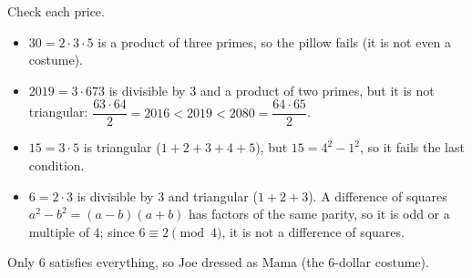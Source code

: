 Check each price.
\begin{itemize}
\item $30=2\cdot3\cdot5$ is a product of three primes, so the pillow fails (it is not even a costume).
\item $2019=3\cdot673$ is divisible by $3$ and a product of two primes, but it is not triangular: $\dfrac{63\cdot64}{2}=2016<2019<2080=\dfrac{64\cdot65}{2}$.
\item $15=3\cdot5$ is triangular ($1+2+3+4+5$), but $15=4^2-1^2$, so it fails the last condition.
\item $6=2\cdot3$ is divisible by $3$ and triangular ($1+2+3$). A difference of squares $a^2-b^2=(a-b)(a+b)$ has factors of the same parity, so it is odd or a multiple of $4$; since $6\equiv2\pmod 4$, it is not a difference of squares.
\end{itemize}
Only $6$ satisfies everything, so Joe dressed as $\boxed{\text{Mama}}$ (the $6$-dollar costume).
